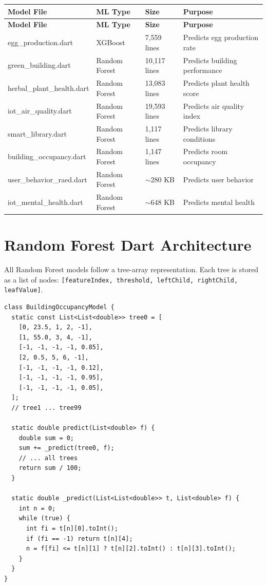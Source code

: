 \documentclass[12pt,a4paper,oneside]{report}
\begin{document}
\begin{longtable}{p{3.5cm} p{2.5cm} p{2.5cm} p{6cm}}
\toprule
\textbf{Model File} & \textbf{ML Type} & \textbf{Size} & \textbf{Purpose} \\
\midrule
\endfirsthead
\toprule
\textbf{Model File} & \textbf{ML Type} & \textbf{Size} & \textbf{Purpose} \\
\midrule
\endhead
\bottomrule
\endfoot
egg\_production.dart & XGBoost & 7,559 lines & Predicts egg production rate \\
green\_building.dart & Random Forest & 10,117 lines & Predicts building performance \\
herbal\_plant\_health.dart & Random Forest & 13,083 lines & Predicts plant health score \\
iot\_air\_quality.dart & Random Forest & 19,593 lines & Predicts air quality index \\
smart\_library.dart & Random Forest & 1,117 lines & Predicts library conditions \\
building\_occupancy.dart & Random Forest & 1,147 lines & Predicts room occupancy \\
user\_behavior\_raed.dart & Random Forest & $\sim$280 KB & Predicts user behavior \\
iot\_mental\_health.dart & Random Forest & $\sim$648 KB & Predicts mental health \\
\bottomrule
\end{longtable}

\section{Random Forest Dart Architecture}

All Random Forest models follow a tree-array representation. Each tree is stored as a list of nodes: \texttt{[featureIndex, threshold, leftChild, rightChild, leafValue]}.

\begin{lstlisting}[style=dartstyle]
class BuildingOccupancyModel {
  static const List<List<double>> tree0 = [
    [0, 23.5, 1, 2, -1],
    [1, 55.0, 3, 4, -1],
    [-1, -1, -1, -1, 0.85],
    [2, 0.5, 5, 6, -1],
    [-1, -1, -1, -1, 0.12],
    [-1, -1, -1, -1, 0.95],
    [-1, -1, -1, -1, 0.05],
  ];
  // tree1 ... tree99

  static double predict(List<double> f) {
    double sum = 0;
    sum += _predict(tree0, f);
    // ... all trees
    return sum / 100;
  }

  static double _predict(List<List<double>> t, List<double> f) {
    int n = 0;
    while (true) {
      int fi = t[n][0].toInt();
      if (fi == -1) return t[n][4];
      n = f[fi] <= t[n][1] ? t[n][2].toInt() : t[n][3].toInt();
    }
  }
}
\end{lstlisting}
\end{document}
